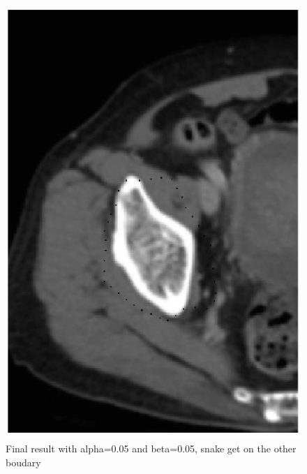 \documentclass[paper=a4, fontsize=11pt]{scrartcl} %
\numberwithin{equation}{section} %
\numberwithin{figure}{section} %
\numberwithin{table}{subsection} %
\begin{document}
\begin{figure}[!htbp]
	\centering
	\includegraphics[width = 12cm]{p3_5.jpg}
	\caption{Final result with alpha=0.05 and beta=0.05, snake get on the other boudary}
\end{figure}
\end{document}
